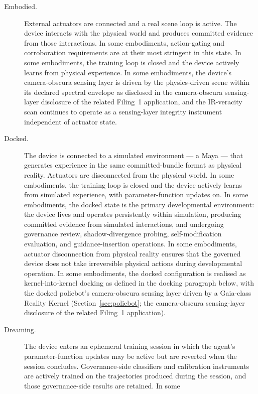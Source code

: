 \documentclass[a4paper,12pt]{article}
\newcommand{\RK}{Reality Kernel\xspace}
\begin{document}
\begin{description}
  \item[Embodied.] External actuators are connected and a real scene
    loop is active. The device interacts with the physical world and
    produces committed evidence from those interactions. In some
    embodiments, action-gating and corroboration requirements are at
    their most stringent in this state. In some embodiments, the
    training loop is closed and the device actively learns from
    physical experience. In some embodiments, the device's
    camera-obscura sensing layer is driven by the physics-driven
    scene within its declared spectral envelope as disclosed in
    the camera-obscura sensing-layer disclosure of the related Filing~1 application, and the IR-veracity scan
    continues to operate as a sensing-layer integrity instrument
    independent of actuator state.
  \item[Docked.] The device is connected to a simulated environment
    --- a Maya --- that generates experience in the same
    committed-bundle format as physical reality. Actuators are
    disconnected from the physical world. In some embodiments, the
    training loop is closed and the device actively learns from
    simulated experience, with parameter-function updates on. In some
    embodiments, the docked state is the primary developmental
    environment: the device lives and operates persistently within
    simulation, producing committed evidence from simulated
    interactions, and undergoing governance review, shadow-divergence
    probing, self-modification evaluation, and guidance-insertion
    operations. In some embodiments, actuator disconnection from
    physical reality ensures that the governed device does not take
    irreversible physical actions during developmental operation. In
    some embodiments, the docked configuration is realised as
    kernel-into-kernel docking as defined in the docking paragraph
    below, with the docked poliebot's camera-obscura sensing layer
    driven by a Gaia-class \RK
    (Section~\ref{sec:poliebot}; the camera-obscura sensing-layer disclosure of the related Filing~1 application).
  \item[Dreaming.] The device enters an ephemeral training session
    in which the agent's parameter-function updates may be active
    but are reverted when the session concludes. Governance-side
    classifiers and calibration instruments are actively trained on
    the trajectories produced during the session, and those
    governance-side results are retained. In some

\end{description}
\end{document}
